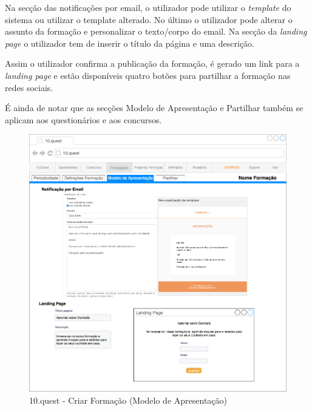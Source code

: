 Na secção das notificações por email, o utilizador pode utilizar o \textit{template} do sistema ou utilizar o template alterado. No último o utilizador pode alterar o assunto da formação e personalizar o texto/corpo do email.
Na secção da \textit{landing page} o utilizador tem de inserir o título da página e uma descrição.

Assim o utilizador confirma a publicação da formação, é gerado um link para a \textit{landing page} e estão disponíveis quatro botões para partilhar a formação nas redes sociais.

É ainda de notar que as secções Modelo de Apresentação e Partilhar também se aplicam aos questionários e aos concursos.


\begin{figure}[ht!]
	\begin{center}
		\includegraphics[width=1\textwidth]{img/prototipos/11.png}
		\caption{10.quest - Criar Formação (Modelo de Apresentação)}
		\label{10q-modelo}
	\end{center}
\end{figure}
\clearpage
\mbox{ }

